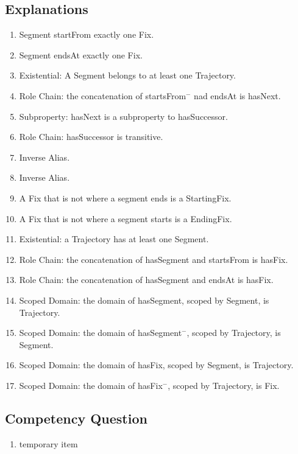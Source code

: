 \subsection{Explanations}
\label{exp:Trajectory}
\begin{enumerate}
\item \textsf{Segment} \textsf{startFrom} exactly one \textsf{Fix}.
\item \textsf{Segment} \textsf{endsAt} exactly one \textsf{Fix}.
\item Existential: A \textsf{Segment} belongs to at least one \textsf{Trajectory}.
\item Role Chain: the concatenation of \textsf{startsFrom}$^-$ nad \textsf{endsAt} is \textsf{hasNext}.
\item Subproperty: \textsf{hasNext} is a subproperty to \textsf{hasSuccessor}.
\item Role Chain: \textsf{hasSuccessor} is transitive.
\item Inverse Alias.
\item Inverse Alias.
\item A \textsf{Fix} that is not where a segment ends is a \textsf{StartingFix}.
\item A \textsf{Fix} that is not where a segment starts is a \textsf{EndingFix}.
\item Existential: a \textsf{Trajectory} has at least one \textsf{Segment}.
\item Role Chain: the concatenation of \textsf{hasSegment} and \textsf{startsFrom} is \textsf{hasFix}.
\item Role Chain: the concatenation of \textsf{hasSegment} and \textsf{endsAt} is \textsf{hasFix}.
\item Scoped Domain: the domain of \textsf{hasSegment}, scoped by \textsf{Segment}, is \textsf{Trajectory}.
\item Scoped Domain: the domain of \textsf{hasSegment}$^-$, scoped by \textsf{Trajectory}, is \textsf{Segment}.
\item Scoped Domain: the domain of \textsf{hasFix}, scoped by \textsf{Segment}, is \textsf{Trajectory}.
\item Scoped Domain: the domain of \textsf{hasFix}$^-$, scoped by \textsf{Trajectory}, is \textsf{Fix}.
\end{enumerate}

\subsection{Competency Question}
\label{cqs:Trajectory}
\begin{enumerate}[CQ1.]
\item temporary item
\end{enumerate}

\newpage
